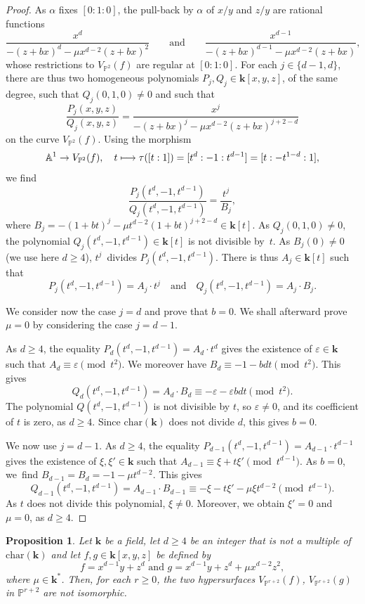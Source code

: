 \documentclass[JEP,XML,SOM,Unicode,NoFloatCountersInSection,published]{cedram}
\let\epsilon\varepsilon
\newcommand\mto{\mathchoice{\longmapsto}{\mapsto}{\mapsto}{\mapsto}}
\newcommand\qquand{\qquad\text{and}\qquad}
\newtheorem{proposition}[lemma]{Proposition}
\theoremstyle{definition}
\newcommand\A{{\mathbb A}}\let\AA\A
\renewcommand\k{{\mathbf k}}
\newcommand\p{{\mathbb P}}\let\PP\p
\newcommand{\kk}{\mathbf{k}}
\begin{document}
\begin{proof}
As $\alpha$ fixes $[0:1:0]$, the pull-back by $\alpha$ of $x/y$ and $z/y$ are rational functions
\[
\frac{x^d}{-(z+bx)^d-\mu x^{d-2}(z+bx)^2} \qquand
\frac{x^{d-1}}{-(z+bx)^{d-1}-\mu x^{d-2}(z+bx)},
\]
whose restrictions to $V_{\p^2}(f)$ are regular at $[0:1:0]$. For each $j\in \{d-1,d\}$, there are thus two homogeneous polynomials $P_j,Q_j\in\k[x,y,z]$, of the same degree, such that $Q_j(0,1,0)\neq 0$ and such that \[\frac{P_j(x,y,z)}{Q_j(x,y,z)}=\frac{x^{j}}{-(z+bx)^{j}-\mu x^{d-2}(z+bx)^{j+2-d}}\] on the curve $V_{\p^2}(f)$. Using the morphism
\[
\A^1\to V_{\p^2}(f), \quad t\mto \tau([t:1])=[t^d:-1:t^{d-1}]=[t:-t^{1-d}:1],
\]
we find
\[
\frac{P_j(t^d,-1,t^{d-1})}{Q_j(t^d,-1,t^{d-1})}=\frac{t^{j}}{B_j},
\]
where $B_j = -(1+bt)^{j}-\mu t^{d-2}(1+bt)^{j+2-d} \in \kk[t]$.
As $Q_j(0,1,0)\neq 0$, the polynomial $Q_j(t^d,-1,t^{d-1})\in \k[t]$ is not divisible by~$t$. As $B_j(0) \neq 0$
(we use here $d \geq 4$), $t^j$~divides $P_j(t^d,-1,t^{d-1})$. There is thus $A_j\in \k[t]$ such that
\[
P_j(t^d,-1,t^{d-1})=A_j\cdot t^j \quad \text{and} \quad Q_j(t^d,-1,t^{d-1})=A_j\cdot B_j.
\]

We consider now the case $j=d$ and prove that $b=0$. We shall afterward prove $\mu=0$ by considering the case $j=d-1$.

As $d\ge 4$, the equality $P_d(t^d,-1,t^{d-1})=A_d\cdot t^d$ gives the existence of $\epsilon\in \k$ such that $A_d\equiv \epsilon \pmod{t^{2}}$. We moreover have $B_d\equiv -1-bdt \pmod{t^2}$. This gives
\[Q_d(t^d,-1,t^{d-1})=A_d\cdot B_d\equiv -\epsilon -\epsilon bdt \pmod{t^2}.\]
The polynomial $Q(t^d,-1,t^{d-1})$ is not divisible by $t$, so $\epsilon\neq 0$, and its coefficient of $t$ is zero, as $d\ge 4$. Since $\mathrm{char}(\k)$ does not divide $d$, this gives $b=0$.

We now use $j=d-1$. As $d\ge 4$, the equality $P_{d-1}(t^d,-1,t^{d-1})=A_{d-1}\cdot t^{d-1}$ gives the existence of $\xi,\xi'\in \k$ such that $A_{d-1}\equiv \xi+t \xi' \pmod{t^{d-1}}$. As $b=0$, we~find $B_{d-1}=B_d=-1-\mu t^{d-2}$. This gives
\[Q_{d-1}(t^d,-1,t^{d-1})=A_{d-1}\cdot B_{d-1}\equiv -\xi-t \xi'-\mu\xi t^{d-2} \pmod{t^{d-1}}.\]
As $t$ does not divide this polynomial, $\xi\neq0$. Moreover, we obtain $\xi'=0$ and $\mu=0$, as $d\ge 4$.
\end{proof}

\begin{proposition}\label{Prop.IsoHypNN3}
Let $\kk$ be a field, let $d\ge 4$ be an integer that is not a multiple of $\mathrm{char}(\kk)$ and let $f,g\in\kk[x,y,z]$ be defined by \[f=x^{d-1}y+z^{d} \text{ and } g=x^{d-1}y+z^{d}+\mu x^{d-2}z^2,\] where $\mu\in \k^*$. Then, for each $r\ge 0$, the two hypersurfaces $V_{\p^{r+2}}(f)$, $V_{\p^{r+2}}(g)$ in $\p^{r+2}$ are not isomorphic.
\end{proposition}
\end{document}
